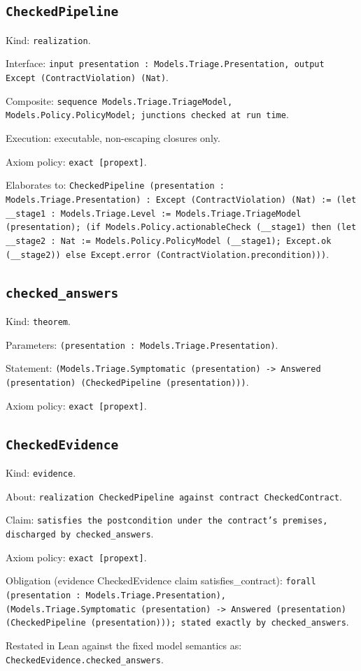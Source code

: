 \documentclass[11pt]{article}
\begin{document}
\subsection*{\texttt{CheckedPipeline}}
\noindent Kind: \texttt{realization}.\par
\noindent Interface: \texttt{input presentation : Models.Triage.Presentation, output Except (ContractViolation) (Nat)}.\par
\noindent Composite: \texttt{sequence Models.Triage.TriageModel, Models.Policy.PolicyModel; junctions checked at run time}.\par
\noindent Execution: executable, non-escaping closures only.\par
\noindent Axiom policy: \texttt{exact [propext]}.\par
\noindent Elaborates to: \texttt{CheckedPipeline (presentation : Models.Triage.Presentation) : Except (ContractViolation) (Nat) := (let \_\_stage1 : Models.Triage.Level := Models.Triage.TriageModel (presentation); (if Models.Policy.actionableCheck (\_\_stage1) then (let \_\_stage2 : Nat := Models.Policy.PolicyModel (\_\_stage1); Except.ok (\_\_stage2)) else Except.error (ContractViolation.precondition)))}.\par
\subsection*{\texttt{checked\_answers}}
\noindent Kind: \texttt{theorem}.\par
\noindent Parameters: \texttt{(presentation : Models.Triage.Presentation)}.\par
\noindent Statement: \texttt{(Models.Triage.Symptomatic (presentation) -> Answered (presentation) (CheckedPipeline (presentation)))}.\par
\noindent Axiom policy: \texttt{exact [propext]}.\par
\subsection*{\texttt{CheckedEvidence}}
\noindent Kind: \texttt{evidence}.\par
\noindent About: \texttt{realization CheckedPipeline against contract CheckedContract}.\par
\noindent Claim: \texttt{satisfies the postcondition under the contract's premises, discharged by checked\_answers}.\par
\noindent Axiom policy: \texttt{exact [propext]}.\par
\noindent Obligation (evidence CheckedEvidence claim satisfies\_contract): \texttt{forall (presentation : Models.Triage.Presentation), (Models.Triage.Symptomatic (presentation) -> Answered (presentation) (CheckedPipeline (presentation))); stated exactly by checked\_answers}.\par
\noindent Restated in Lean against the fixed model semantics as: \texttt{CheckedEvidence.checked\_answers}.\par
\end{document}
